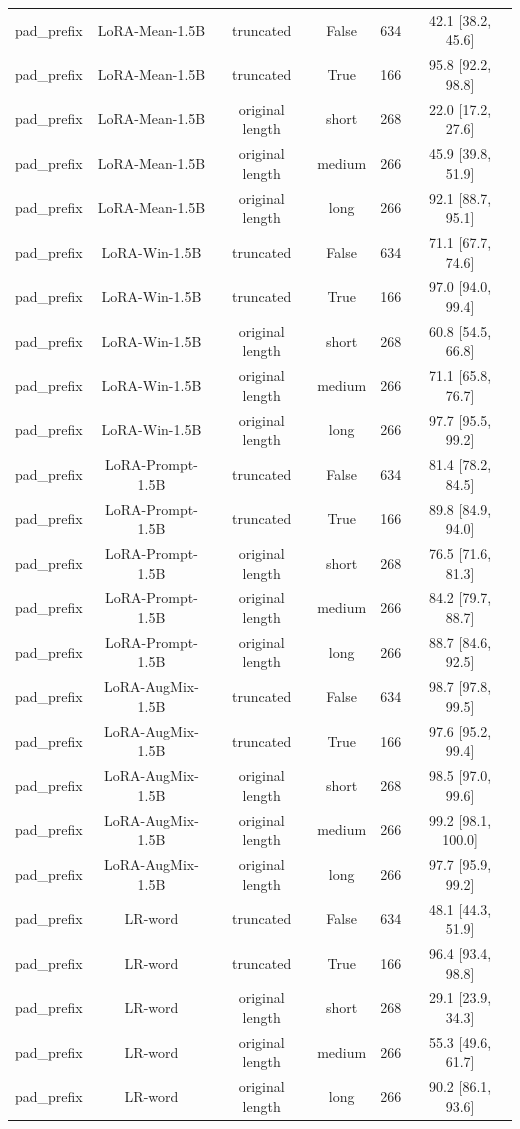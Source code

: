 \begin{table}[t]
\begin{tabular}{lccccc}
pad\_prefix & LoRA-Mean-1.5B & truncated & False & 634 & 42.1 [38.2, 45.6] \\
pad\_prefix & LoRA-Mean-1.5B & truncated & True & 166 & 95.8 [92.2, 98.8] \\
pad\_prefix & LoRA-Mean-1.5B & original length & short & 268 & 22.0 [17.2, 27.6] \\
pad\_prefix & LoRA-Mean-1.5B & original length & medium & 266 & 45.9 [39.8, 51.9] \\
pad\_prefix & LoRA-Mean-1.5B & original length & long & 266 & 92.1 [88.7, 95.1] \\
pad\_prefix & LoRA-Win-1.5B & truncated & False & 634 & 71.1 [67.7, 74.6] \\
pad\_prefix & LoRA-Win-1.5B & truncated & True & 166 & 97.0 [94.0, 99.4] \\
pad\_prefix & LoRA-Win-1.5B & original length & short & 268 & 60.8 [54.5, 66.8] \\
pad\_prefix & LoRA-Win-1.5B & original length & medium & 266 & 71.1 [65.8, 76.7] \\
pad\_prefix & LoRA-Win-1.5B & original length & long & 266 & 97.7 [95.5, 99.2] \\
pad\_prefix & LoRA-Prompt-1.5B & truncated & False & 634 & 81.4 [78.2, 84.5] \\
pad\_prefix & LoRA-Prompt-1.5B & truncated & True & 166 & 89.8 [84.9, 94.0] \\
pad\_prefix & LoRA-Prompt-1.5B & original length & short & 268 & 76.5 [71.6, 81.3] \\
pad\_prefix & LoRA-Prompt-1.5B & original length & medium & 266 & 84.2 [79.7, 88.7] \\
pad\_prefix & LoRA-Prompt-1.5B & original length & long & 266 & 88.7 [84.6, 92.5] \\
pad\_prefix & LoRA-AugMix-1.5B & truncated & False & 634 & 98.7 [97.8, 99.5] \\
pad\_prefix & LoRA-AugMix-1.5B & truncated & True & 166 & 97.6 [95.2, 99.4] \\
pad\_prefix & LoRA-AugMix-1.5B & original length & short & 268 & 98.5 [97.0, 99.6] \\
pad\_prefix & LoRA-AugMix-1.5B & original length & medium & 266 & 99.2 [98.1, 100.0] \\
pad\_prefix & LoRA-AugMix-1.5B & original length & long & 266 & 97.7 [95.9, 99.2] \\
pad\_prefix & LR-word & truncated & False & 634 & 48.1 [44.3, 51.9] \\
pad\_prefix & LR-word & truncated & True & 166 & 96.4 [93.4, 98.8] \\
pad\_prefix & LR-word & original length & short & 268 & 29.1 [23.9, 34.3] \\
pad\_prefix & LR-word & original length & medium & 266 & 55.3 [49.6, 61.7] \\
pad\_prefix & LR-word & original length & long & 266 & 90.2 [86.1, 93.6] \\
\bottomrule
\end{tabular}
\end{table}